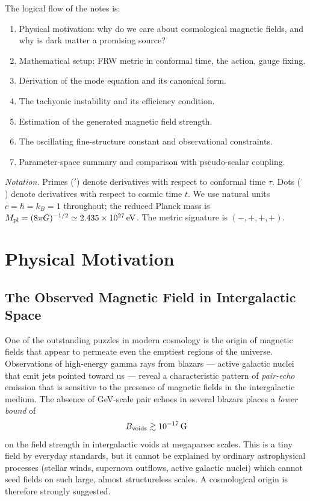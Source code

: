 \documentclass[12pt,a4paper,openany]{book}
\newcommand{\Mpl}{M_{\rm pl}}
\begin{document}
\medskip
The logical flow of the notes is:
\begin{enumerate}[label=\arabic*.]
  \item Physical motivation: why do we care about cosmological magnetic fields, and why is dark matter a promising source?
  \item Mathematical setup: FRW metric in conformal time, the action, gauge fixing.
  \item Derivation of the mode equation and its canonical form.
  \item The tachyonic instability and its efficiency condition.
  \item Estimation of the generated magnetic field strength.
  \item The oscillating fine-structure constant and observational constraints.
  \item Parameter-space summary and comparison with pseudo-scalar coupling.
\end{enumerate}

\bigskip
\noindent\textit{Notation.} Primes ($\prime$) denote derivatives with respect to conformal time $\tau$. Dots ($\dot{\phantom{x}}$) denote derivatives with respect to cosmic time $t$. We use natural units $c = \hbar = k_B = 1$ throughout; the reduced Planck mass is $\Mpl = (8\pi G)^{-1/2} \simeq 2.435\times10^{27}\,\mathrm{eV}$. The metric signature is $(-,+,+,+)$.

\chapter{Physical Motivation}

\section{The Observed Magnetic Field in Intergalactic Space}

One of the outstanding puzzles in modern cosmology is the origin of magnetic fields that appear to permeate even the emptiest regions of the universe. Observations of high-energy gamma rays from blazars — active galactic nuclei that emit jets pointed toward us — reveal a characteristic pattern of \emph{pair-echo} emission that is sensitive to the presence of magnetic fields in the intergalactic medium. The absence of GeV-scale pair echoes in several blazars places a \emph{lower bound} of
\begin{equation}
  B_{\rm voids} \gtrsim 10^{-17}\,\mathrm{G}
\end{equation}
on the field strength in intergalactic voids at megaparsec scales. This is a tiny field by everyday standards, but it cannot be explained by ordinary astrophysical processes (stellar winds, supernova outflows, active galactic nuclei) which cannot seed fields on such large, almost structureless scales. A cosmological origin is therefore strongly suggested.
\end{document}
